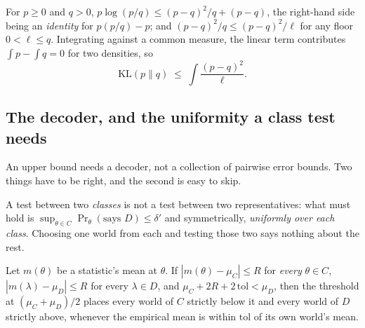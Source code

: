 \begin{theorem}
\label{thm:env2kl}
For $p\ge0$ and $q>0$,
$p\log(p/q)\le(p-q)^{2}/q+(p-q)$, the right-hand side being an \emph{identity} for
$p(p/q)-p$; and $(p-q)^{2}/q\le(p-q)^{2}/\ell$ for any floor $0<\ell\le q$. Integrating
against a common measure, the linear term contributes $\int p-\int q=0$ for two densities,
so
\[
\mathrm{KL}(p\|q)\;\le\;\int\frac{(p-q)^{2}}{\ell}.
\]
\end{theorem}



\subsection{The decoder, and the uniformity a class test needs}
\label{sec:decoder}

An upper bound needs a decoder, not a collection of pairwise error bounds. Two things have to
be right, and the second is easy to skip.

A test between two \emph{classes} is not a test between two representatives: what must hold
is $\sup_{\theta\in C}\Pr_{\theta}(\text{says }D)\le\delta'$ and symmetrically,
\emph{uniformly over each class}. Choosing one world from each and testing those two says
nothing about the rest.

\begin{theorem}
\label{thm:composite}
Let $m(\theta)$ be a statistic's mean at $\theta$. If $|m(\theta)-\mu_{C}|\le R$ for
\emph{every} $\theta\in C$, $|m(\lambda)-\mu_{D}|\le R$ for every $\lambda\in D$, and
$\mu_{C}+2R+2\,\mathrm{tol}<\mu_{D}$, then the threshold at $(\mu_{C}+\mu_{D})/2$ places
every world of $C$ strictly below it and every world of $D$ strictly above, whenever the
empirical mean is within $\mathrm{tol}$ of its own world's mean.
\end{theorem}

